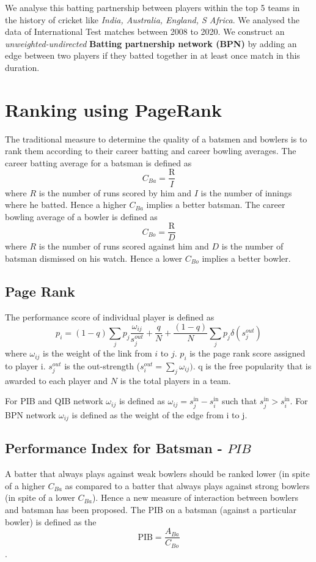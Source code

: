 \documentclass{article}
\begin{document}
We analyse this batting partnership between players within the top 5 teams in the history of cricket like \textit{India, Australia, England, S Africa}. We analysed the data of International Test matches between 2008 to 2020. We construct an \textit{unweighted-undirected} \textbf{Batting partnership network (BPN)} by adding an edge between two players if they batted together in at least once match in this duration.

\section{Ranking using PageRank}
The traditional measure to determine the quality of a batsmen and bowlers is to rank them according to their career batting and career bowling averages. The career batting average for a batsman is defined as $$C_{Ba} = \frac{\mathrm{R}}{I}$$ where $R$ is the number of runs scored by him and $I$ is the number of innings where he batted. Hence a higher $C_{Ba}$ implies a better batsman. The career bowling average of a bowler is defined as $$C_{Bo} = \frac{\mathrm{R}}{D}$$ where $R$ is the number of runs scored against him and $D$ is the number of batsman dismissed on his watch. Hence a lower $C_{Bo}$ implies a better bowler.

\subsection{Page Rank}
The performance score of individual player is defined as $$p_i = (1 - q)\sum_{j}p_j\frac{\omega_{ij}}{s_j^{out}} + \frac{q}{N} + \frac{(1 - q)}{N}\sum_{j}p_j\delta(s_j^{out})$$
where $\omega_{ij}$ is the weight of the link from $i$ to $j$. $p_i$ is the page rank score assigned to player i. $s_j^{out}$ is the out-strength ($s^{out}_{i} = \sum_{j}\omega_{ij})$. q is the free popularity that is awarded to each player and $N$ is the total players in a team. 

For PIB and QIB network $\omega_{ij}$ is defined as $\omega_{ij} = s_j^{\mathrm{in}} - s_i^{\mathrm{in}}$ such that $s_j^{\mathrm{in}} > s_i^{\mathrm{in}}$. For BPN network $\omega _{ij}$ is defined as the weight of the edge from i to j.

\subsection{Performance Index for Batsman - $PIB$}
A batter that always plays against weak bowlers should be ranked lower (in spite of a higher $C_{Ba}$  as compared to a batter that always plays against strong bowlers (in spite of a lower $C_{Ba}$). Hence a new measure of interaction between bowlers and batsman has been proposed. The PIB on a batsman (against a particular bowler) is defined as the $$\mathrm{PIB} = \frac{A_{Ba}}{C_{Bo}}$$. 
\end{document}
